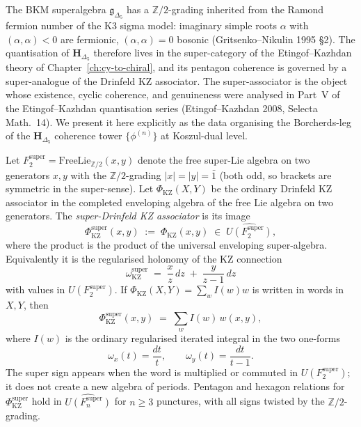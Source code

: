The BKM superalgebra $\mathfrak{g}_{\Delta_5}$ has a $\mathbb{Z}/2$-grading
inherited from the Ramond fermion number of the K3 sigma model: imaginary
simple roots $\alpha$ with $(\alpha, \alpha) < 0$ are fermionic,
$(\alpha, \alpha) = 0$ bosonic (Gritsenko--Nikulin 1995 \S 2). The
quantisation of $\mathbf{H}_{\Delta_5}$ therefore lives in the
super-category of the Etingof--Kazhdan theory of
Chapter~\ref{ch:cy-to-chiral}, and its pentagon coherence is governed by
a super-analogue of the Drinfeld KZ associator. The super-associator is
the object whose existence, cyclic coherence, and genuineness were
analysed in Part~V of the Etingof--Kazhdan quantisation series
(Etingof--Kazhdan 2008, Selecta Math.~14). We present it here
explicitly as the data organising the Borcherds-leg of the
$\mathbf{H}_{\Delta_5}$ coherence tower $\{\phi^{(n)}\}$ at
Koszul-dual level.

\begin{definition}
\label{def:super-drinfeld-associator}
Let $F_2^{\mathrm{super}} = \mathrm{FreeLie}_{\mathbb{Z}/2}(x, y)$ denote
the free super-Lie algebra on two generators $x, y$ with the
$\mathbb{Z}/2$-grading $|x| = |y| = \bar{1}$ (both odd, so brackets are
symmetric in the super-sense).  Let
$\Phi_{\mathrm{KZ}}(X,Y)$ be the ordinary Drinfeld KZ associator in the
completed enveloping algebra of the free Lie algebra on two generators.
The \emph{super-Drinfeld KZ associator} is its image
\begin{equation}
 \Phi_{\mathrm{KZ}}^{\mathrm{super}}(x, y)
 \;:=\;
 \Phi_{\mathrm{KZ}}(x,y)
 \;\in\; \widehat{U(F_2^{\mathrm{super}})},
\end{equation}
where the product is the product of the universal enveloping
super-algebra.  Equivalently it is the regularised holonomy of the KZ
connection
\begin{equation}
 \omega_{\mathrm{KZ}}^{\mathrm{super}}
 \;=\;
 \frac{x}{z} \, dz \;+\; \frac{y}{z - 1} \, dz
\end{equation}
with values in $U(F_2^{\mathrm{super}})$.  If
$\Phi_{\mathrm{KZ}}(X,Y)=\sum_w I(w)w$ is written in words in $X,Y$,
then
\begin{equation}
 \label{eq:super-KZ-expansion}
 \Phi_{\mathrm{KZ}}^{\mathrm{super}}(x, y)
 \;=\;
 \sum_w I(w)\,w(x,y),
\end{equation}
where $I(w)$ is the ordinary regularised iterated integral in the two
one-forms
\begin{equation}
 \omega_x(t) = \frac{dt}{t}, \qquad
 \omega_y(t) = \frac{dt}{t - 1}.
\end{equation}
The super sign appears when the word is multiplied or commuted in
$U(F_2^{\mathrm{super}})$; it does not create a new algebra of periods.
Pentagon and hexagon relations for $\Phi_{\mathrm{KZ}}^{\mathrm{super}}$
hold in $\widehat{U(F_n^{\mathrm{super}})}$ for $n \geq 3$ punctures,
with all signs twisted by the $\mathbb{Z}/2$-grading.
\end{definition}

